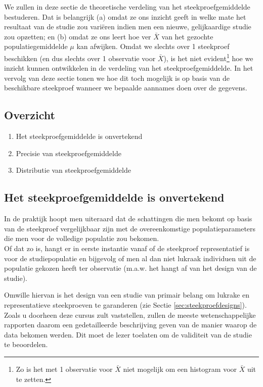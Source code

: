 \documentclass[
  12pt,dutch,coursenotes]{book}
\providecommand{\tightlist}{%
  \setlength{\itemsep}{0pt}\setlength{\parskip}{0pt}}
\theoremstyle{definition}
\theoremstyle{definition}
\theoremstyle{definition}
\theoremstyle{remark}
\begin{document}
We zullen in deze sectie de theoretische verdeling van het steekproefgemiddelde bestuderen.
Dat is belangrijk (a) omdat ze ons inzicht geeft in welke mate het resultaat van de studie zou variëren indien men een nieuwe, gelijkaardige studie zou opzetten; en (b) omdat ze ons leert hoe ver \(\bar X\) van het gezochte populatiegemiddelde \(\mu\) kan afwijken.
Omdat we slechts over 1 steekproef beschikken (en dus slechts over 1 observatie voor \(\bar X\)), is het niet evident\footnote{Zo is het met 1 observatie voor \(\bar X\) niet mogelijk om een histogram voor \(\bar X\) uit te zetten.} hoe we inzicht
kunnen ontwikkelen in de verdeling van het steekproefgemiddelde.
In het vervolg van deze sectie tonen we hoe dit toch mogelijk is op basis van de
beschikbare steekproef wanneer we bepaalde aannames doen over de gegevens.

\hypertarget{overzicht}{%
\subsection{Overzicht}\label{overzicht}}

\begin{enumerate}
\def\labelenumi{\arabic{enumi}.}
\tightlist
\item
  Het steekproefgemiddelde is onvertekend
\item
  Precisie van steekproefgemiddelde
\item
  Distributie van steekproefgemiddelde
\end{enumerate}

\hypertarget{het-steekproefgemiddelde-is-onvertekend}{%
\subsection{Het steekproefgemiddelde is onvertekend}\label{het-steekproefgemiddelde-is-onvertekend}}

In de praktijk hoopt men uiteraard dat de schattingen die men bekomt op basis van de steekproef vergelijkbaar zijn met de overeenkomstige populatieparameters die men voor de volledige populatie zou bekomen.\\
Of dat zo is, hangt er in eerste instantie vanaf of de steekproef representatief is voor de studiepopulatie en bijgevolg of men al dan niet lukraak individuen uit de populatie gekozen heeft ter observatie (m.a.w. het hangt af van het design van de studie).

Omwille hiervan is het design van een studie van primair belang om lukrake en representatieve steekproeven te garanderen (zie Sectie \ref{sec:steekproefdesigns}).
Zoals u doorheen deze cursus zult vaststellen, zullen de meeste wetenschappelijke rapporten daarom een gedetailleerde beschrijving geven van de manier waarop de data bekomen werden. Dit moet de lezer toelaten om de validiteit van de studie te beoordelen.
\end{document}
